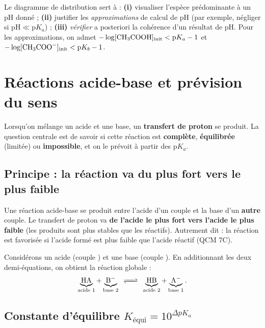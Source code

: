 \documentclass[11pt,a4paper]{article}
\begin{document}
\begin{remarque}
Le diagramme de distribution sert à : \textbf{(i)} visualiser l'espèce prédominante à un pH donné ;
\textbf{(ii)} justifier les \emph{approximations} de calcul de pH (par exemple, négliger  si
$\mathrm{pH} \ll \mathrm{p}K_a$) ; \textbf{(iii)} \emph{vérifier} a posteriori la cohérence d'un résultat de
pH. Pour les approximations, on admet $-\log[\ce{CH3COOH}]_{\text{init}} < \mathrm{p}K_a - 1$ et
$-\log[\ce{CH3COO-}]_{\text{init}} < \mathrm{p}K_b - 1$.
\end{remarque}

\section{Réactions acide-base et prévision du sens}
\label{sec:reaction}
Lorsqu'on mélange un acide et une base, un \textbf{transfert de proton} se produit. La question centrale est
de savoir si cette réaction est \textbf{complète}, \textbf{équilibrée} (limitée) ou \textbf{impossible}, et
on le prévoit à partir des $\mathrm{p}K_a$.

\subsection{Principe : la réaction va du plus fort vers le plus faible}

\begin{regle}
Une réaction acide-base se produit entre l'acide d'un couple et la base d'un \textbf{autre} couple. Le
transfert de proton va \textbf{de l'acide le plus fort vers l'acide le plus faible} (les produits sont plus
stables que les réactifs). Autrement dit : la réaction est favorisée si l'acide formé est plus faible que
l'acide réactif (QCM 7C).
\end{regle}

Considérons un acide  (couple ) et une base  (couple ). En additionnant les
deux demi-équations, on obtient la réaction globale :
\[ \underbrace{\ce{HA}}_{\text{acide 1}} + \underbrace{\ce{B-}}_{\text{base 2}}
   \;\ce{<=>}\; \underbrace{\ce{HB}}_{\text{acide 2}} + \underbrace{\ce{A-}}_{\text{base 1}}. \]

\subsection{Constante d'équilibre $K_{\text{équi}} = 10^{\Delta pK_a}$}
\end{document}
